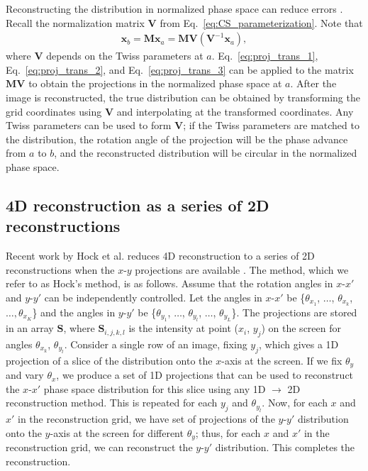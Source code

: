 Reconstructing the distribution in normalized phase space can reduce errors \cite{Hock2011}. Recall the normalization matrix $\mathbf{V}$ from Eq.~\eqref{eq:CS_parameterization}. Note that
%
\begin{equation}
\begin{aligned}
    \mathbf{x}_b 
    = \mathbf{M} \mathbf{x}_a
    = \mathbf{M} \mathbf{V} (\mathbf{V}^{-1} \mathbf{x}_a)
    ,
\end{aligned}
\end{equation}
%
where $\mathbf{V}$ depends on the Twiss parameters at $a$. Eq.~\eqref{eq:proj_trans_1}, Eq.~\eqref{eq:proj_trans_2}, and Eq.~\eqref{eq:proj_trans_3} can be applied to the matrix $\mathbf{M} \mathbf{V}$ to obtain the projections in the normalized phase space at $a$. After the image is reconstructed, the true distribution can be obtained by transforming the grid coordinates using $\mathbf{V}$ and interpolating at the transformed coordinates. Any Twiss parameters can be used to form $\mathbf{V}$; if the Twiss parameters are matched to the distribution, the rotation angle of the projection will be the phase advance from $a$ to $b$, and the reconstructed distribution will be circular in the normalized phase space. 


\subsection{4D reconstruction as a series of 2D reconstructions}

Recent work by Hock et al. reduces 4D reconstruction to a series of 2D reconstructions when the $x$-$y$ projections are available \cite{Hock2013a}. The method, which we refer to as Hock's method, is as follows. Assume that the rotation angles in $x$-$x'$ and $y$-$y'$ can be independently controlled. Let the angles in $x$-$x'$ be \{$\theta_{x_1}$, $\dots$, $\theta_{x_k}$, $\dots, \theta_{x_K}$\} and the angles in $y$-$y'$ be \{$\theta_{y_1}$, $\dots$, $\theta_{y_l}$, $\dots$, $\theta_{y_L}$\}. The projections are stored in an array $\mathbf{S}$, where $\mathbf{S}_{i,j,k,l}$ is the intensity at point ($x_i$, $y_j$) on the screen for angles $\theta_{x_k}$, $\theta_{y_l}$. Consider a single row of an image, fixing $y_j$, which gives a 1D projection of a slice of the distribution onto the $x$-axis at the screen. If we fix $\theta_{y}$ and vary $\theta_{x}$, we produce a set of 1D projections that can be used to reconstruct the $x$-$x'$ phase space distribution for this slice using any 1D $\rightarrow$ 2D reconstruction method. This is repeated for each $y_j$ and $\theta_{y_l}$. Now, for each $x$ and $x'$ in the reconstruction grid, we have set of projections of the $y$-$y'$ distribution onto the $y$-axis at the screen for different $\theta_{y}$; thus, for each $x$ and $x'$ in the reconstruction grid, we can reconstruct the $y$-$y'$ distribution. This completes the reconstruction.

